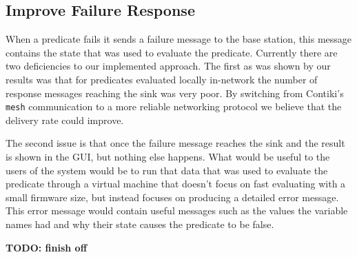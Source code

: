 \subsection{Improve Failure Response}

When a predicate fails it sends a failure message to the base station, this message contains the state that was used to evaluate the predicate. Currently there are two deficiencies to our implemented approach. The first as was shown by our results was that for predicates evaluated locally in-network the number of response messages reaching the sink was very poor. By switching from Contiki's \verb|mesh| communication to a more reliable networking protocol we believe that the delivery rate could improve.

The second issue is that once the failure message reaches the sink and the result is shown in the GUI, but nothing else happens. What would be useful to the users of the system would be to run that data that was used to evaluate the predicate through a virtual machine that doesn't focus on fast evaluating with a small firmware size, but instead focuses on producing a detailed error message. This error message would contain useful messages such as the values the variable names had and why their state causes the predicate to be false.


\textbf{TODO: finish off}

